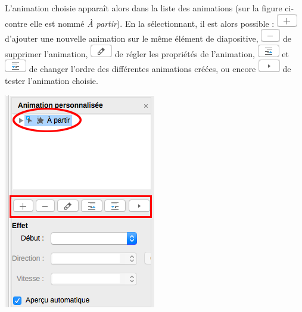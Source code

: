 \begin{minipage}[c]{.58\textwidth}
L'animation choisie apparaît alors dans la liste des animations (sur la figure ci-contre elle est nommé \emph{\og À partir\fg}). En la sélectionnant, il est alors possible : \includegraphics[width=.7cm]{./images/presentation/boutonPlus} d'ajouter une nouvelle animation sur le même élément de diapositive, \includegraphics[width=.7cm]{./images/presentation/boutonMoins} de supprimer l'animation, \includegraphics[width=.7cm]{./images/presentation/boutonCrayon} de régler les propriétés de l'animation, \includegraphics[width=.7cm]{./images/presentation/boutonHaut} et \includegraphics[width=.7cm]{./images/presentation/boutonBas} de changer l'ordre des différentes animations créées, ou encore \includegraphics[width=.7cm]{./images/presentation/boutonPlay} de tester l'animation choisie.    
\end{minipage}\hfill%
\begin{minipage}[c]{.38\textwidth}
\centering%
\includegraphics[angle=0,width=.7\textwidth]{./images/presentation/Impress_08_Transitions_04}
\end{minipage}

